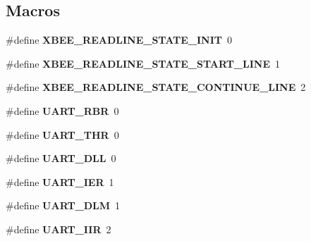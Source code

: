 \subsection*{Macros}
\begin{DoxyCompactItemize}
\item 
\hypertarget{group__hal__dos_ga029adc5ad3f556e4c5671b21529c0dd1}{\#define {\bfseries X\-B\-E\-E\-\_\-\-R\-E\-A\-D\-L\-I\-N\-E\-\_\-\-S\-T\-A\-T\-E\-\_\-\-I\-N\-I\-T}~0}\label{group__hal__dos_ga029adc5ad3f556e4c5671b21529c0dd1}

\item 
\hypertarget{group__hal__dos_gaa3a6d3307bf92060ea7c2664dc9e7b6b}{\#define {\bfseries X\-B\-E\-E\-\_\-\-R\-E\-A\-D\-L\-I\-N\-E\-\_\-\-S\-T\-A\-T\-E\-\_\-\-S\-T\-A\-R\-T\-\_\-\-L\-I\-N\-E}~1}\label{group__hal__dos_gaa3a6d3307bf92060ea7c2664dc9e7b6b}

\item 
\hypertarget{group__hal__dos_ga5eb45373870b820af1c6c5d2918ee9c1}{\#define {\bfseries X\-B\-E\-E\-\_\-\-R\-E\-A\-D\-L\-I\-N\-E\-\_\-\-S\-T\-A\-T\-E\-\_\-\-C\-O\-N\-T\-I\-N\-U\-E\-\_\-\-L\-I\-N\-E}~2}\label{group__hal__dos_ga5eb45373870b820af1c6c5d2918ee9c1}

\item 
\hypertarget{group__hal__dos_ga3eb7d5a767dae7774aa2b4be28e20a7e}{\#define {\bfseries U\-A\-R\-T\-\_\-\-R\-B\-R}~0}\label{group__hal__dos_ga3eb7d5a767dae7774aa2b4be28e20a7e}

\item 
\hypertarget{group__hal__dos_ga7a676f075475e46d27eb878977b867ec}{\#define {\bfseries U\-A\-R\-T\-\_\-\-T\-H\-R}~0}\label{group__hal__dos_ga7a676f075475e46d27eb878977b867ec}

\item 
\hypertarget{group__hal__dos_ga7ff21e0cfc73a2db80c3907c5cac5a61}{\#define {\bfseries U\-A\-R\-T\-\_\-\-D\-L\-L}~0}\label{group__hal__dos_ga7ff21e0cfc73a2db80c3907c5cac5a61}

\item 
\hypertarget{group__hal__dos_gaaf7aaa372e86b3aa99e6c78242be2722}{\#define {\bfseries U\-A\-R\-T\-\_\-\-I\-E\-R}~1}\label{group__hal__dos_gaaf7aaa372e86b3aa99e6c78242be2722}

\item 
\hypertarget{group__hal__dos_ga63f95172026aa533407e357e73b04551}{\#define {\bfseries U\-A\-R\-T\-\_\-\-D\-L\-M}~1}\label{group__hal__dos_ga63f95172026aa533407e357e73b04551}

\item 
\hypertarget{group__hal__dos_ga16add7e6b9f91a6698c5910704111b68}{\#define {\bfseries U\-A\-R\-T\-\_\-\-I\-I\-R}~2}\label{group__hal__dos_ga16add7e6b9f91a6698c5910704111b68}


\end{DoxyCompactItemize}
